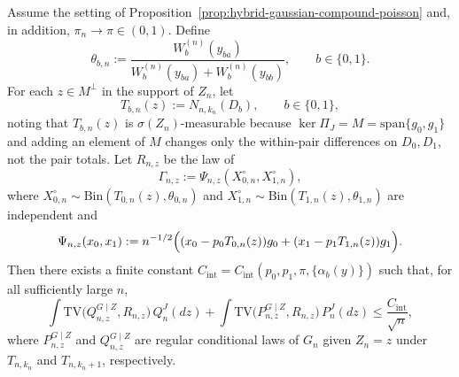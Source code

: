 \documentclass[10pt,a4paper]{amsart}
\begin{document}
\begin{lemma}
\label{lem:interior-conditional-smoothing}
Assume the setting of Proposition~\ref{prop:hybrid-gaussian-compound-poisson} and, in addition, $\pi_n\to\pi\in(0,1)$. Define
\[
\theta_{b,n}:=\frac{W_b^{(n)}(y_{ba})}{W_b^{(n)}(y_{ba})+W_b^{(n)}(y_{bb})},
\qquad b\in\{0,1\}.
\]
For each $z\in M^\perp$ in the support of $Z_n$, let
\[
T_{b,n}(z):=N_{n,k_n}(D_b),
\qquad b\in\{0,1\},
\]
noting that $T_{b,n}(z)$ is $\sigma(Z_n)$-measurable because $\ker \Pi_J=M=\mathrm{span}\{g_0,g_1\}$ and adding an element of $M$ changes only the within-pair differences on $D_0,D_1$, not the pair totals. Let $R_{n,z}$ be the law of
\[
\Gamma_{n,z}:=\Psi_{n,z}(X_{0,n}^\circ,X_{1,n}^\circ),
\]
where $X_{0,n}^\circ\sim \mathrm{Bin}(T_{0,n}(z),\theta_{0,n})$ and $X_{1,n}^\circ\sim \mathrm{Bin}(T_{1,n}(z),\theta_{1,n})$ are independent and
\[
\Psi_{n,z}(x_0,x_1):=n^{-1/2}\Bigl((x_0-p_0T_{0,n}(z))g_0+(x_1-p_1T_{1,n}(z))g_1\Bigr).
\]
Then there exists a finite constant $C_{\mathrm{int}}=C_{\mathrm{int}}(p_0,p_1,\pi,\{\alpha_b(y)\})$ such that, for all sufficiently large $n$,
\begin{equation}
\int \mathrm{TV}\bigl(Q_{n,z}^{G\mid Z},R_{n,z}\bigr)\,Q_n^J(dz)
+\int \mathrm{TV}\bigl(P_{n,z}^{G\mid Z},R_{n,z}\bigr)\,P_n^J(dz)
\le \frac{C_{\mathrm{int}}}{\sqrt n},
\label{eq:B3-main}
\end{equation}
where $P_{n,z}^{G\mid Z}$ and $Q_{n,z}^{G\mid Z}$ are regular conditional laws of $G_n$ given $Z_n=z$ under $T_{n,k_n}$ and $T_{n,k_n+1}$, respectively.
\end{lemma}
\end{document}
